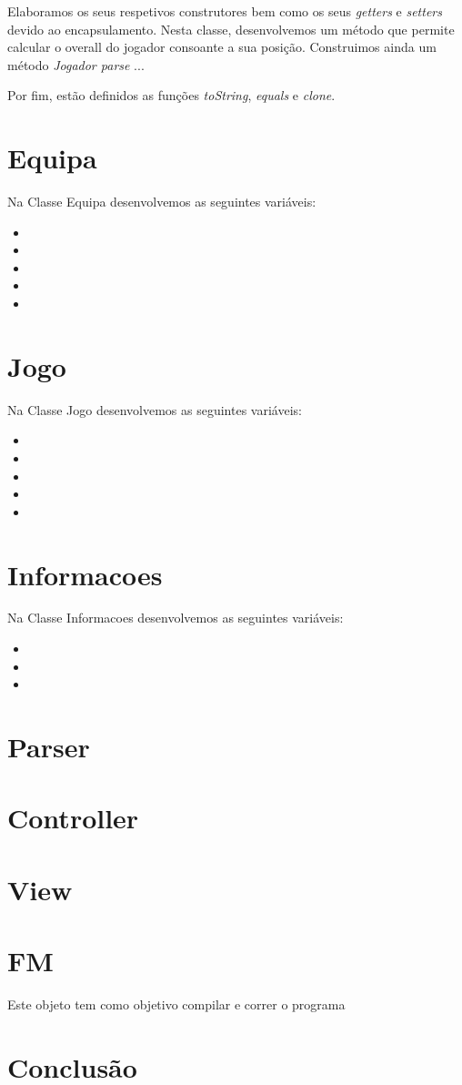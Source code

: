 \documentclass[a4paper,12pt]{article}
\begin{document}
    Elaboramos os seus respetivos construtores bem como os seus \emph{getters} e \emph{setters} devido ao encapsulamento.
Nesta classe, desenvolvemos um método que permite calcular o overall do jogador consoante a sua posição. Construimos
ainda um método \emph{ Jogador parse} ...\par
    Por fim, estão definidos as funções \emph{toString}, \emph{equals} e \emph{clone}.

\section{Equipa}
    Na Classe Equipa desenvolvemos as seguintes variáveis:
    \begin{itemize}
        \item
        \item
        \item
        \item
        \item
    \end{itemize}


\section{Jogo}
    Na Classe Jogo desenvolvemos as seguintes variáveis:
    \begin{itemize}
        \item
        \item
        \item
        \item
        \item
    \end{itemize}

\section{Informacoes}
    Na Classe Informacoes desenvolvemos as seguintes variáveis:
    \begin{itemize}
        \item
        \item
        \item
    \end{itemize}

\section{Parser}

\section{Controller}

\section{View}

\section{FM}
    Este objeto tem como objetivo compilar e correr o programa

\section{Conclusão}
\end{document}

